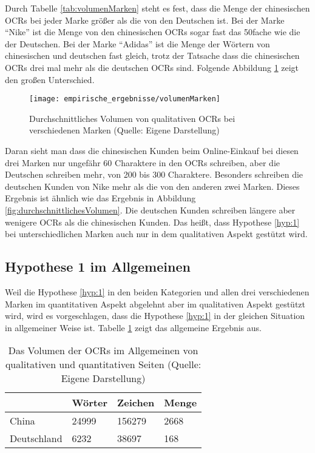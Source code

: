 Durch Tabelle \ref{tab:volumenMarken} steht es fest, dass die Menge der chinesischen \ac{OCRs} bei jeder Marke größer als die von den Deutschen ist. Bei der Marke ``Nike'' ist die Menge von den chinesischen \ac{OCRs} sogar fast das 50fache wie die der Deutschen. Bei der Marke ``Adidas'' ist die Menge der Wörtern von chinesischen und deutschen fast gleich, trotz der Tatsache dass die chinesischen \ac{OCRs} drei mal mehr als die deutschen \ac{OCRs} sind. Folgende Abbildung \ref{fig:volumenMarken} zeigt den großen Unterschied.
\begin{figure}[htb]
\centering
    \texttt{[image: empirische\_ergebnisse/volumenMarken]} 
    \caption[Durchschnittliches Volumen von qualitativen OCRs bei verschiedenen Marken]{Durchschnittliches Volumen von qualitativen \ac{OCRs} bei verschiedenen Marken (Quelle: Eigene Darstellung)}
    \label{fig:volumenMarken}
\end{figure}

Daran sieht man dass die chinesischen Kunden beim Online-Einkauf bei diesen drei Marken nur ungefähr 60 Charaktere in den \ac{OCRs} schreiben, aber die Deutschen schreiben mehr, von 200 bis 300 Charaktere. Besonders schreiben die deutschen Kunden von Nike mehr als die von den anderen zwei Marken. Dieses Ergebnis ist ähnlich wie das Ergebnis in Abbildung \ref{fig:durchschnittlichesVolumen}. Die deutschen Kunden schreiben längere aber wenigere \ac{OCRs} als die chinesischen Kunden. Das heißt, dass Hypothese \ref{hyp:1} bei unterschiedlichen Marken auch nur in dem qualitativen Aspekt gestützt wird. 
\subsection{Hypothese 1 im Allgemeinen}
Weil die Hypothese \ref{hyp:1} in den beiden Kategorien und allen drei verschiedenen Marken im quantitativen Aspekt abgelehnt aber im qualitativen Aspekt gestützt wird, wird es vorgeschlagen, dass die Hypothese \ref{hyp:1} in der gleichen Situation in allgemeiner Weise ist. Tabelle \ref{tab:volumenAllgemeinen} zeigt das allgemeine Ergebnis aus.
\begin{table}[htb]
\centering
\begin{tabular}{|l|l|l|l|}
\hline
            & Wörter & Zeichen & Menge \\ \hline
China       & 24999 & 156279  & 2668   \\ \hline
Deutschland & 6232   & 38697   & 168    \\ \hline
\end{tabular}
\caption[Das Volumen der OCRs im Allgemeinen von qualitativen und quantitativen Seiten]{Das Volumen der \ac{OCRs} im Allgemeinen von qualitativen und quantitativen Seiten (Quelle: Eigene Darstellung)}
\label{tab:volumenAllgemeinen}
\end{table}

